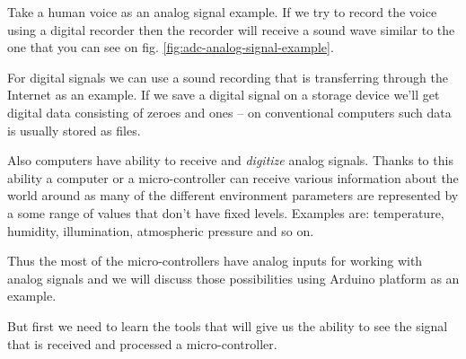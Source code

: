 \documentclass[../sparc.tex]{subfiles}
\begin{document}
Take a human voice as an analog signal example.  If we try to record the voice
using a digital recorder then the recorder will receive a sound wave similar to
the one that you can see on fig. \ref{fig:adc-analog-signal-example}.

For digital signals we can use a sound recording that is transferring through
the Internet as an example.  If we save a digital signal on a storage device
we'll get digital data consisting of zeroes and ones -- on conventional computers
such data is usually stored as files.

Also computers have ability to receive and \emph{digitize} analog signals.
Thanks to this ability a computer or a micro-controller can receive various
information about the world around as many of the different environment
parameters are represented by a some range of values that don't have fixed
levels.  Examples are: temperature, humidity, illumination, atmospheric pressure
and so on.

Thus the most of the micro-controllers have analog inputs for working with
analog signals and we will discuss those possibilities using Arduino platform as
an example.

But first we need to learn the tools that will give us the ability to see the
signal that is received and processed a micro-controller.
\end{document}
